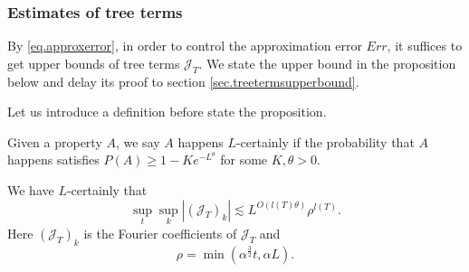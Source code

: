 \subsubsection{Estimates of tree terms} By \eqref{eq.approxerror}, in order to control the approximation error $Err$, it suffices to get upper bounds of tree terms $\mathcal{J}_T$. We state the upper bound in the proposition below and delay its proof to section \ref{sec.treetermsupperbound}.

Let us introduce a definition before state the proposition.

\begin{defn}
Given a property $A$, we say $A$ happens $L$-certainly if the probability that $A$ happens satisfies $P(A)\ge 1-Ke^{-L^\theta}$ for some $K, \theta>0$.
\end{defn}

\begin{prop}\label{prop.treetermsupperbound}
We have $L$-certainly that 
\begin{equation}
    \sup_t\sup_k  |(\mathcal{J}_T)_k|\lesssim L^{O(l(T)\theta)} \rho^{l(T)}.
\end{equation}
Here $(\mathcal{J}_T)_k$ is the Fourier coefficients of $\mathcal{J}_T$ and 
\begin{equation}
    \rho=\min(\alpha^{\frac{3}{2}}t,\alpha L).
\end{equation}
\end{prop}